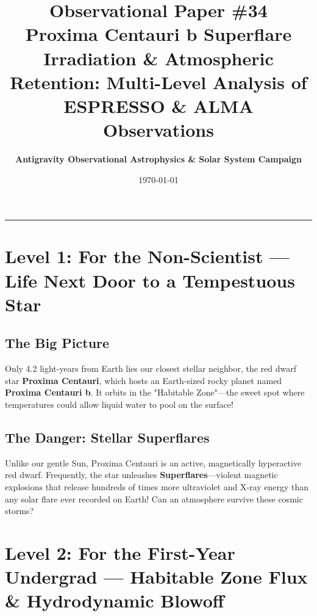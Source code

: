 \documentclass[11pt,a4paper]{article}
\title{\Huge \textbf{Observational Paper \#34}\\ \Large Proxima Centauri b Superflare Irradiation \& Atmospheric Retention: Multi-Level Analysis of ESPRESSO \& ALMA Observations}
\author{\textbf{Antigravity Observational Astrophysics \& Solar System Campaign}}
\date{\today}
\begin{document}
\maketitle

\vspace{-1em}
\begin{center}
\rule{\textwidth}{1.5pt}
\end{center}

\section*{Level 1: For the Non-Scientist — Life Next Door to a Tempestuous Star}

\subsection*{The Big Picture}
Only 4.2 light-years from Earth lies our closest stellar neighbor, the red dwarf star \textbf{Proxima Centauri}, which hosts an Earth-sized rocky planet named \textbf{Proxima Centauri b}. It orbits in the "Habitable Zone"—the sweet spot where temperatures could allow liquid water to pool on the surface!

\subsection*{The Danger: Stellar Superflares}
Unlike our gentle Sun, Proxima Centauri is an active, magnetically hyperactive red dwarf. Frequently, the star unleashes \textbf{Superflares}—violent magnetic explosions that release hundreds of times more ultraviolet and X-ray energy than any solar flare ever recorded on Earth! Can an atmosphere survive these cosmic storms?

\newpage

\section*{Level 2: For the First-Year Undergrad — Habitable Zone Flux \& Hydrodynamic Blowoff}
\end{document}
